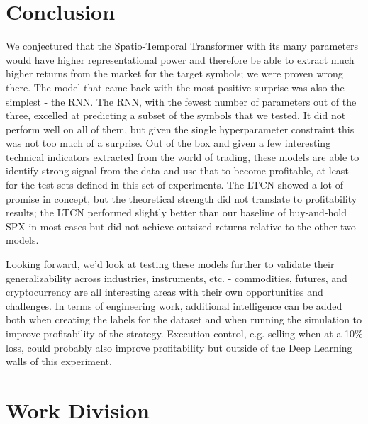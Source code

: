 \documentclass[10pt,twocolumn,letterpaper]{article}
\begin{document}
\section{Conclusion}

We conjectured that the Spatio-Temporal Transformer with its many parameters would have higher representational power and therefore be able to extract much higher returns from the market for the target symbols; we were proven wrong there. The model that came back with the most positive surprise was also the simplest - the RNN. The RNN, with the fewest number of parameters out of the three, excelled at predicting a subset of the symbols that we tested. It did not perform well on all of them, but given the single hyperparameter constraint this was not too much of a surprise. Out of the box and given a few interesting technical indicators extracted from the world of trading, these models are able to identify strong signal from the data and use that to become profitable, at least for the test sets defined in this set of experiments. The LTCN showed a lot of promise in concept, but the theoretical strength did not translate to profitability results; the LTCN performed slightly better than our baseline of buy-and-hold SPX in most cases but did not achieve outsized returns relative to the other two models.

Looking forward, we’d look at testing these models further to validate their generalizability across industries, instruments, etc. - commodities, futures, and cryptocurrency are all interesting areas with their own opportunities and challenges. In terms of engineering work, additional intelligence can be added both when creating the labels for the dataset and when running the simulation to improve profitability of the strategy. Execution control, e.g. selling when at a 10\% loss, could probably also improve profitability but outside of the Deep Learning walls of this experiment.





\clearpage
\section{Work Division}
\end{document}
